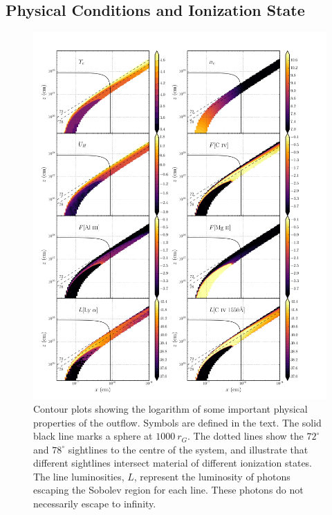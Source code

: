 \documentclass[useAMS,usenatbib]{mn2e_x}
\begin{document}
\subsection{Physical Conditions and Ionization State}


\begin{figure} %
\centering
\includegraphics[width=1.0\textwidth]{figures/link8.png}
\caption
{
Contour plots showing the logarithm of some important 
physical properties of the outflow. Symbols are defined in the text.
The solid black line marks a sphere at $1000~r_G$.
The dotted lines show the $72^\circ$ and $78^\circ$ sightlines 
to the centre of the system, and illustrate that different sightlines
intersect material of different ionization states.
The line luminosities, $L$, represent the luminosity of photons
escaping the Sobolev region for each line. These photons do not
necessarily escape to infinity.
}
\label{fig:wind}
\end{figure} %
\end{document}
